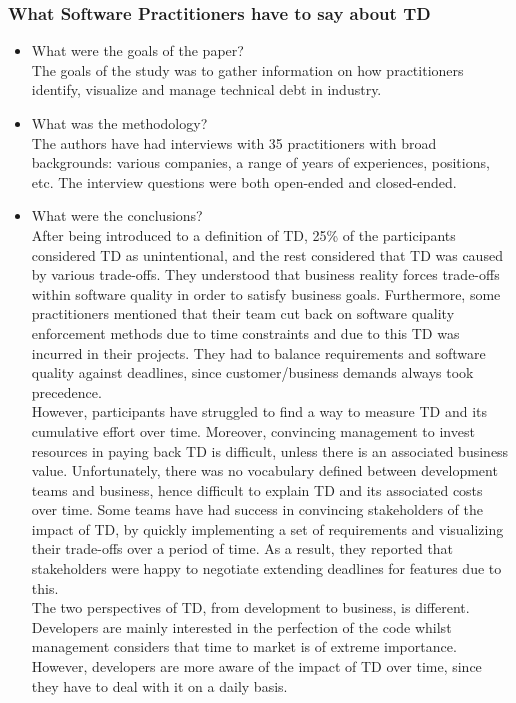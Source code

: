 \documentclass{mprop}
\begin{document}
\subsubsection{What Software Practitioners have to say about TD} \cite{Lim2012}
\begin{itemize}
	\item What were the goals of the paper? \\
	      The goals of the study was to gather information on how practitioners identify, visualize and manage technical debt in industry.
	\item What was the methodology? \\
	      The authors have had interviews with 35 practitioners with broad backgrounds: various companies, a range of years of experiences, positions, etc.
	      The interview questions were both open-ended and closed-ended.
	\item What were the conclusions? \\
	      After being introduced to a definition of TD, 25\% of the participants considered TD as unintentional, and the rest considered that TD was caused by various trade-offs.
	      They understood that business reality forces trade-offs within software quality in order to satisfy business goals.
	      Furthermore, some practitioners mentioned that their team cut back on software quality enforcement methods due to time constraints and due to this TD was incurred in their projects.
	      They had to balance requirements and software quality against deadlines, since customer/business demands always took precedence. \\

	      However, participants have struggled to find a way to measure TD and its cumulative effort over time.
	      Moreover, convincing management to invest resources in paying back TD is difficult, unless there is an associated business value.
	      Unfortunately, there was no vocabulary defined between development teams and business, hence difficult to explain TD and its associated costs over time.
	      Some teams have had success in convincing stakeholders of the impact of TD, by quickly implementing a set of requirements and visualizing their trade-offs over a period of time.
	      As a result, they reported that stakeholders were happy to negotiate extending deadlines for features due to this. \\

	      The two perspectives of TD, from development to business, is different.
	      Developers are mainly interested in the perfection of the code whilst management considers that time to market is of extreme importance.
	      However, developers are more aware of the impact of TD over time, since they have to deal with it on a daily basis. \\


\end{itemize}
\end{document}
